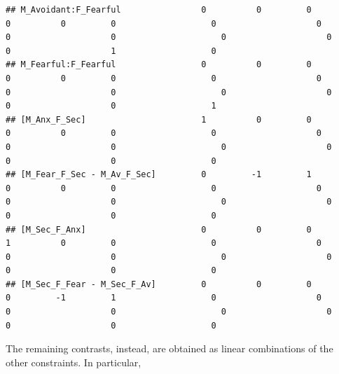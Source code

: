\documentclass[
]{book}
\begin{document}
\begin{verbatim}
## M_Avoidant:F_Fearful                0          0         0         0          0         0                   0                    0                   0                    0                     0                    0                   0                    1                   0
## M_Fearful:F_Fearful                 0          0         0         0          0         0                   0                    0                   0                    0                     0                    0                   0                    0                   1
## [M_Anx_F_Sec]                       1          0         0         0          0         0                   0                    0                   0                    0                     0                    0                   0                    0                   0
## [M_Fear_F_Sec - M_Av_F_Sec]         0         -1         1         0          0         0                   0                    0                   0                    0                     0                    0                   0                    0                   0
## [M_Sec_F_Anx]                       0          0         0         1          0         0                   0                    0                   0                    0                     0                    0                   0                    0                   0
## [M_Sec_F_Fear - M_Sec_F_Av]         0          0         0         0         -1         1                   0                    0                   0                    0                     0                    0                   0                    0                   0
\end{verbatim}

The remaining contrasts, instead, are obtained as linear combinations of the other constraints. In particular,
\end{document}
